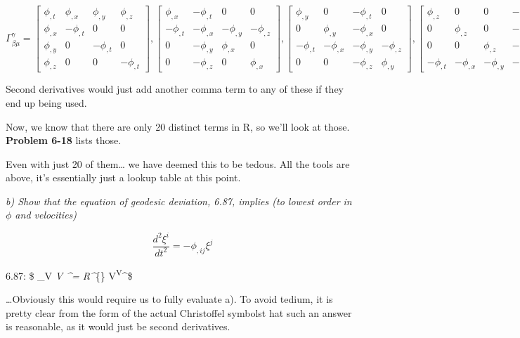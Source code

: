 \documentclass[landscape,letterpaper,10pt,english]{article}
\begin{document}
\[ \Gamma^{\gamma}_{\beta\mu} = \begin{bmatrix}
\phi_{,t} & \phi_{,x} & \phi_{,y} & \phi_{,z} \\ 
\phi_{,x} & -\phi_{,t} & 0 & 0 \\
\phi_{,y} & 0 & -\phi_{,t} & 0 \\
\phi_{,z} & 0 & 0 & -\phi_{,t}
\end{bmatrix},\begin{bmatrix}
\phi_{,x} & -\phi_{,t} & 0 & 0 \\ 
-\phi_{,t} & -\phi_{,x} & -\phi_{,y} & -\phi_{,z} \\
0 & -\phi_{,y} & \phi_{,x} & 0 \\
0 & -\phi_{,z} & 0 & \phi_{,x}
\end{bmatrix},\begin{bmatrix}
\phi_{,y} & 0 & -\phi_{,t} & 0 \\ 
0 & \phi_{,y} & -\phi_{,x} & 0 \\
-\phi_{,t} & -\phi_{,x} & -\phi_{,y} & -\phi_{,z} \\
0 & 0 & -\phi_{,z} & \phi_{,y}
\end{bmatrix},\begin{bmatrix}
\phi_{,z} & 0 & 0 & -\phi_{,t} \\ 
0 & \phi_{,z} & 0 & -\phi_{,x} \\
0 & 0 & \phi_{,z} & -\phi_{,y} \\
-\phi_{,t} & -\phi_{,x} & -\phi_{,y} & -\phi_{,z}
\end{bmatrix}
\]

Second derivatives would just add another comma term to any of these if
they end up being used.

Now, we know that there are only 20 distinct terms in R, so we'll look
at those. \textbf{Problem 6-18} lists those.

Even with just 20 of them\ldots{} we have deemed this to be tedous. All
the tools are above, it's essentially just a lookup table at this point.

    \emph{b) Show that the equation of geodesic deviation, 6.87, implies (to
lowest order in \(\phi\) and velocities)}

\[ \frac{d^2\xi^i}{dt^2} = -\phi_{,ij}\xi^j \]

    6.87: \$ \nabla\_V \nabla\emph{V \xi\^{}\alpha =
R\^{}\alpha}\{\mu\nu\beta\} V\textsuperscript{\mu V}\nu \xi\^{}\beta\$

\ldots Obviously this would require us to fully evaluate a). To avoid
tedium, it is pretty clear from the form of the actual Christoffel
symbolst hat such an answer is reasonable, as it would just be second
derivatives.
\end{document}
